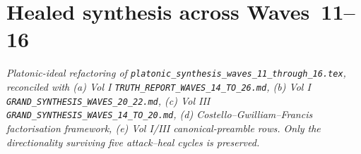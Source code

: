 
\providecommand{\ClaimStatusTheorem}{\textsc{[Theorem]}}
\providecommand{\ClaimStatusConjectured}{\textsc{[Conjectured]}}
\providecommand{\ClaimStatusCorrected}{\textsc{[Corrected]}}
\providecommand{\ClaimStatusOpen}{\textsc{[Open]}}
\providecommand{\ClaimStatusRetracted}{\textsc{[Retracted]}}
\providecommand{\ClaimStatusDefinition}{\textsc{[Definition]}}
\providecommand{\ClaimStatusHealed}{\textsc{[Healed]}}
\providecommand{\kBKM}{\kappa_{\mathrm{BKM}}}
\providecommand{\kch}{\kappa_{\mathrm{ch}}}
\providecommand{\kcat}{\kappa_{\mathrm{cat}}}
\providecommand{\kfib}{\kappa_{\mathrm{fiber}}}
\providecommand{\kanom}{\kappa_{\mathrm{anom}}}
\providecommand{\ZZ}{\mathbb{Z}}
\providecommand{\QQ}{\mathbb{Q}}
\providecommand{\RR}{\mathbb{R}}
\providecommand{\CC}{\mathbb{C}}
\providecommand{\HH}{\mathbb{H}}
\providecommand{\CYcat}{\mathrm{CY}\text{-cat}}
\providecommand{\ChirAlg}{\mathrm{ChirAlg}}
\providecommand{\HolFA}{\mathrm{HolFA}}
\providecommand{\hCS}{\mathrm{hCS}}
\providecommand{\Obs}{\mathrm{Obs}}
\providecommand{\CE}{\mathrm{CE}}
\providecommand{\chir}{\mathrm{chir}}
\providecommand{\Sp}{\mathrm{Sp}}
\providecommand{\cE}{\mathcal{E}}
\providecommand{\cO}{\mathcal{O}}
\providecommand{\cF}{\mathcal{F}}
\providecommand{\fg}{\mathfrak{g}}
\providecommand{\Yplus}{Y^+_{\epsilon_1,\epsilon_2}}
\providecommand{\CoHA}{\mathrm{CoHA}}
\providecommand{\Winf}{\mathcal{W}_{1+\infty}}
\providecommand{\Mtf}{M_{24}}
\providecommand{\bH}{\mathbf{H}}

\section{Healed synthesis across Waves~11--16}
\label{wn:sec:healed-synthesis-11-16}

\emph{Platonic-ideal refactoring of \texttt{platonic\_synthesis\_waves\_11\_through\_16.tex}, reconciled with (a) Vol I \texttt{TRUTH\_REPORT\_WAVES\_14\_TO\_26.md}, (b) Vol I \texttt{GRAND\_SYNTHESIS\_WAVES\_20\_22.md}, (c) Vol III \texttt{GRAND\_SYNTHESIS\_WAVES\_14\_TO\_20.md}, (d) Costello--Gwilliam--Francis factorisation framework, (e) Vol I/III canonical-preamble rows. Only the directionality surviving five attack--heal cycles is preserved.}

